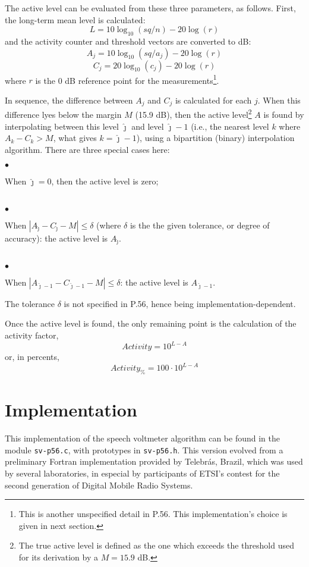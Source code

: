 The active level can be evaluated from these three parameters, as follows. 
First, the long-term mean level is calculated:
\[
L = 10 \log_{10}(sq/n) - 20 \log(r)
\]
and the activity counter and threshold vectors are converted to dB:
\[
A_j = 10 \log_{10}(sq/a_j) - 20 \log(r)
\]
\[
C_j = 20 \log_{10}(c_j) - 20 \log(r)
\]
where $r$ is the 0 dB reference point for the
measurements\footnote{\SF This is another unspecified detail in
P.56. This implementation's choice is given in next section.}.

In sequence, the difference between $A_j$ and $C_j$ is calculated for
each $j$. When this difference lyes below the margin $M$ (15.9 dB),
then the active level\footnote{\SF The true active level is defined
as the one which exceeds the threshold used for its derivation by a
$M=15.9$ dB.} $A$ is found by interpolating between this level
$\hat{\jmath}$ and level $\hat{\jmath}-1$ (i.e., the nearest level $k$
where $A_k-C_k>M$, what gives $k=\hat{\jmath}-1$), using a
bipartition (binary) interpolation algorithm. There are three special
cases here:

\begin{minipage}{130mm}
 $\bullet$ \parbox[t]{120mm}{
                When $\hat{\jmath}=0$, then the active level is zero;}\\
 $\bullet$ \parbox[t]{120mm}{
                When $|A_{\hat{\jmath}}-C_{\hat{\jmath}}-M| \leq \delta$ 
                (where $\delta$ is the the given tolerance, or degree of 
                accuracy): the active level is $A_{\hat{\jmath}}$.}\\
 $\bullet$ \parbox[t]{120mm}{
                When $|A_{\hat{\jmath}-1}-C_{\hat{\jmath}-1}-M| \leq \delta$:  
                the active level is $A_{\hat{\jmath}-1}$.}
\end{minipage}

The tolerance $\delta$ is not specified in P.56, hence being 
implementation-dependent.

Once the active level is found, the only remaining point is the
calculation of the activity factor,
\[ Activity = 10 ^ {L-A}\]
or, in percents,
\[ Activity_\% = 100 \cdot 10 ^ {L-A}\]


\section{Implementation}

This implementation of the speech voltmeter algorithm can be found in
the module {\tt sv-p56.c}, with prototypes in {\tt sv-p56.h}. This
version evolved from a preliminary Fortran implementation provided by
Telebr\'{a}s, Brazil, which was used by several laboratories, in
especial by participants of ETSI's contest for the second generation
of Digital Mobile Radio Systems.

